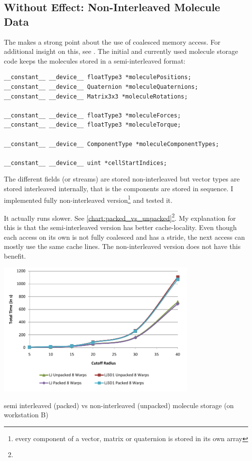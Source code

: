 \subsection{Without Effect: Non-Interleaved Molecule Data}
The \cite{cuda11bestpract} makes a strong point about the use of coalesced memory access. For additional insight on this, see \cite{volkov10}. The initial and currently used molecule storage code keeps the molecules stored in a semi-interleaved format:
\begin{lstlisting}[caption=Molecule Storage Declarations]
__constant__ __device__ floatType3 *moleculePositions;
__constant__ __device__ Quaternion *moleculeQuaternions;
__constant__ __device__ Matrix3x3 *moleculeRotations;

__constant__ __device__ floatType3 *moleculeForces;
__constant__ __device__ floatType3 *moleculeTorque;

__constant__ __device__ ComponentType *moleculeComponentTypes;

__constant__ __device__ uint *cellStartIndices;
\end{lstlisting}
The different fields (or streams) are stored non-interleaved but vector types are stored interleaved internally, that is the components are stored in sequence. I implemented fully non-interleaved version\footnote{every component of a vector, matrix or quaternion is stored in its own array} and tested it.

It actually runs slower. See \autoref{chart:packed_vs_unpacked}\footnote{\cudaConfigDouble{}}. My explanation for this is that the semi-interleaved version has better cache-locality. Even though each access on its own is not fully coalesced and has a stride, the next access can mostly use the same cache lines.
The non-interleaved version does not have this benefit.
\begin{chart}
\centering
\includegraphics[width=0.75\textwidth]{plots/packed_vs_unpacked.pdf}
\caption{semi interleaved (packed) vs non-interleaved (unpacked) molecule storage (on workstation B)}
\label{chart:packed_vs_unpacked}
\end{chart}